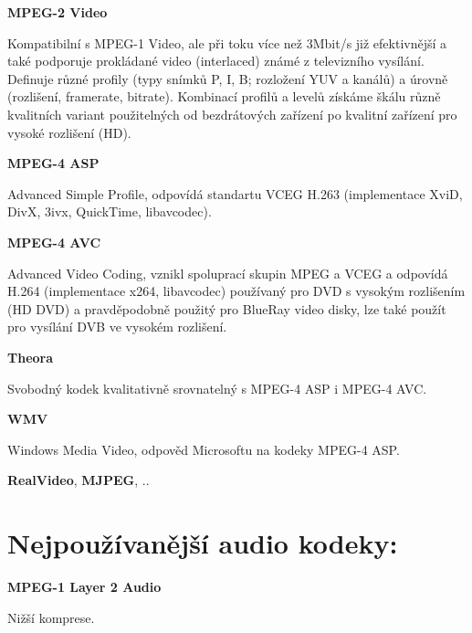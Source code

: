 \vspace{10pt}

\textbf{MPEG-2 Video}

Kompatibilní s MPEG-1 Video, ale při toku více než 3Mbit/s již efektivnější a také podporuje prokládané video (interlaced) známé z televizního vysílání. Definuje různé profily (typy snímků P, I, B; rozložení YUV a kanálů) a úrovně (rozlišení, framerate, bitrate). Kombinací profilů a levelů získáme škálu různě kvalitních variant použitelných od bezdrátových zařízení po kvalitní zařízení pro vysoké rozlišení (HD).

\vspace{10pt}

\textbf{MPEG-4 ASP}

Advanced Simple Profile, odpovídá standartu VCEG H.263 (implementace XviD, DivX, 3ivx, QuickTime, libavcodec).

\vspace{10pt}

\textbf{MPEG-4 AVC}

Advanced Video Coding, vznikl spoluprací skupin MPEG a VCEG a odpovídá H.264 (implementace x264, libavcodec) používaný pro DVD s vysokým rozlišením (HD DVD) a pravděpodobně použitý pro BlueRay video disky, lze také použít pro vysílání DVB ve vysokém rozlišení.

\vspace{10pt}

\textbf{Theora}

Svobodný kodek kvalitativně srovnatelný s MPEG-4 ASP i MPEG-4 AVC.

\vspace{10pt}

\textbf{WMV}

Windows Media Video, odpověd Microsoftu na kodeky MPEG-4 ASP.

\vspace{10pt}

\textbf{RealVideo}, \textbf{MJPEG}, ..

\vspace{10pt}

\section{Nejpoužívanější audio kodeky:}

\vspace{10pt}

\textbf{MPEG-1 Layer 2 Audio}

Nižší komprese.

